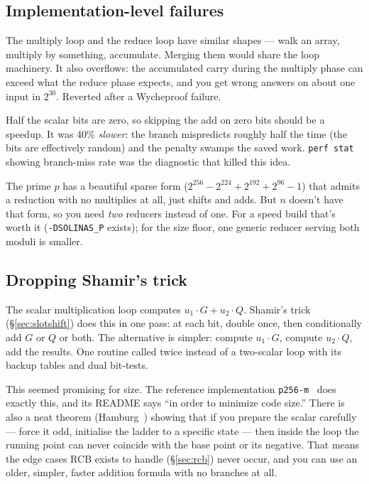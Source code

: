 \documentclass[11pt,a4paper]{article}
\begin{document}
\subsection{Implementation-level failures}

\begin{description}[leftmargin=1em,style=nextline]
\item[Merging schoolbook and reduce into one loop.] The multiply
  loop and the reduce loop have similar shapes --- walk an array,
  multiply by something, accumulate. Merging them would share the
  loop machinery. It also overflows: the accumulated carry during
  the multiply phase can exceed what the reduce phase expects, and
  you get wrong answers on about one input in $2^{30}$. Reverted
  after a Wycheproof failure.
\item[Zero-skip in the scalar loop.] Half the scalar bits are zero,
  so skipping the add on zero bits should be a speedup. It was 40\%
  \emph{slower}: the branch mispredicts roughly half the time (the
  bits are effectively random) and the penalty swamps the saved
  work. \texttt{perf stat} showing branch-miss rate was the
  diagnostic that killed this idea.
\item[Solinas reduction for both moduli.] The prime $p$ has a
  beautiful sparse form ($2^{256} - 2^{224} + 2^{192} + 2^{96} - 1$)
  that admits a reduction with no multiplies at all, just shifts and
  adds. But $n$ doesn't have that form, so you need \emph{two}
  reducers instead of one. For a speed build that's worth it
  (\texttt{-DSOLINAS\_P} exists); for the size floor, one generic
  reducer serving both moduli is smaller.
\end{description}

\subsection{Dropping Shamir's trick}

The scalar multiplication loop computes $u_1 \cdot G + u_2 \cdot Q$.
Shamir's trick (\S\ref{sec:slotshift}) does this in one pass: at each
bit, double once, then conditionally add $G$ or $Q$ or both. The
alternative is simpler: compute $u_1 \cdot G$, compute $u_2 \cdot Q$,
add the results. One routine called twice instead of a two-scalar
loop with its backup tables and dual bit-tests.

This seemed promising for size. The reference implementation
\texttt{p256-m}~\cite{p256m} does exactly this, and its README says
``in order to minimize code size.'' There is also a neat theorem
(Hamburg~\cite{hamburg}) showing that if you prepare the scalar
carefully --- force it odd, initialise the ladder to a specific state
--- then inside the loop the running point can never coincide with the
base point or its negative. That means the edge cases RCB exists to
handle (\S\ref{sec:rcb}) never occur, and you can use an older,
simpler, faster addition formula with no branches at all.
\end{document}
